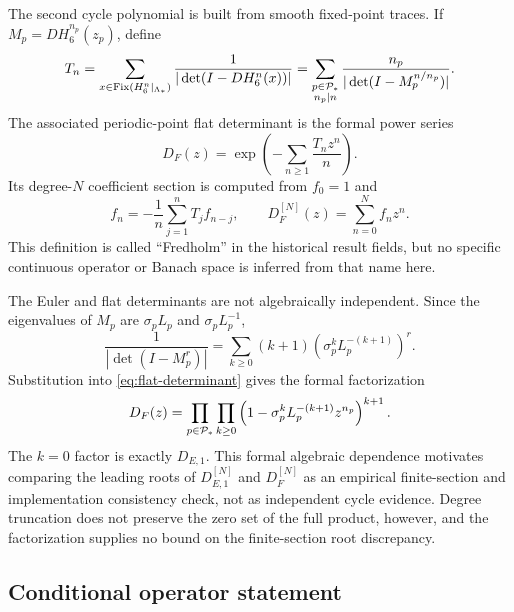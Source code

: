 The second cycle polynomial is built from smooth fixed-point traces.  If
$M_p=DH_6^{n_p}(z_p)$, define
\begin{equation}
 T_n=\sum_{x\in\operatorname{Fix}(H_6^n|_{\Lambda_*})}
 \frac{1}{|\det(I-DH_6^n(x))|}
 =\sum_{\substack{p\in\mathcal{P}_*\\n_p\mid n}}
 \frac{n_p}{|\det(I-M_p^{n/n_p})|}.
 \label{eq:flat-traces}
\end{equation}
The associated periodic-point flat determinant is the formal power series
\begin{equation}
 D_F(z)=\exp\left(-\sum_{n\geq1}\frac{T_nz^n}{n}\right).
 \label{eq:flat-determinant}
\end{equation}
Its degree-$N$ coefficient section is computed from $f_0=1$ and
\begin{equation}
 f_n=-\frac1n\sum_{j=1}^nT_jf_{n-j},
 \qquad D_F^{[N]}(z)=\sum_{n=0}^Nf_nz^n.
 \label{eq:flat-recurrence}
\end{equation}
This definition is called ``Fredholm'' in the historical result fields, but no
specific continuous operator or Banach space is inferred from that name here.

The Euler and flat determinants are not algebraically independent.  Since the
eigenvalues of $M_p$ are $\sigma_pL_p$ and $\sigma_pL_p^{-1}$,
\begin{equation}
 \frac1{|\det(I-M_p^r)|}
 =\sum_{k\geq0}(k+1)
 \left(\sigma_p^kL_p^{-(k+1)}\right)^r.
 \label{eq:flat-factor-expansion}
\end{equation}
Substitution into \eqref{eq:flat-determinant} gives the formal factorization
\begin{equation}
 D_F(z)=\prod_{p\in\mathcal{P}_*}\prod_{k\geq0}
 \left(1-\sigma_p^kL_p^{-(k+1)}z^{n_p}\right)^{k+1}.
 \label{eq:flat-factorization}
\end{equation}
The $k=0$ factor is exactly $D_{E,1}$.  This formal algebraic dependence
motivates comparing the leading roots of $D_{E,1}^{[N]}$ and $D_F^{[N]}$ as an
empirical finite-section and implementation consistency check, not as
independent cycle evidence.  Degree truncation does not preserve the zero set
of the full product, however, and the factorization supplies no bound on the
finite-section root discrepancy.

\subsection{Conditional operator statement}


